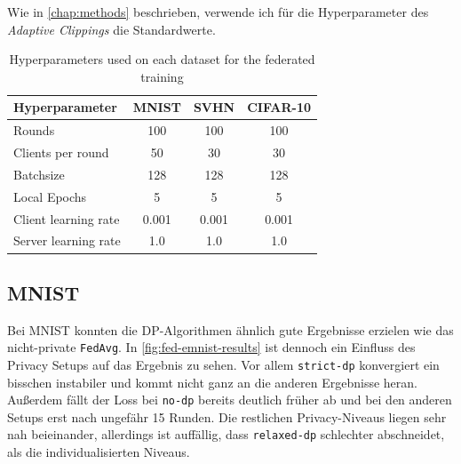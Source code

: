 Wie in \autoref{chap:methods} beschrieben, verwende ich für die Hyperparameter des \textit{Adaptive Clippings} die Standardwerte.

\begin{table}[tb]
	\centering
	\begin{tabular}{|l|c|c|c|}
		\hline
		Hyperparameter & MNIST & SVHN & CIFAR-10 \\
		\hline
		Rounds & 100 & 100 & 100 \\
		Clients per round & 50 & 30 & 30 \\
		Batchsize & 128 & 128 & 128 \\
		Local Epochs & 5 & 5 & 5 \\
		Client learning rate & 0.001 & 0.001 & 0.001 \\
		Server learning rate & 1.0 & 1.0 & 1.0 \\
		\hline
	\end{tabular}
	\caption{Hyperparameters used on each dataset for the federated training}
	\label{tab:fl-hyperparameters}
\end{table}

\subsection{MNIST}

Bei MNIST konnten die DP-Algorithmen ähnlich gute Ergebnisse erzielen wie das nicht-private \texttt{FedAvg}. In \autoref{fig:fed-emnist-results} ist dennoch ein Einfluss des Privacy Setups auf das Ergebnis zu sehen. Vor allem \texttt{strict-dp} konvergiert ein bisschen instabiler und kommt nicht ganz an die anderen Ergebnisse heran. Außerdem fällt der Loss bei \texttt{no-dp} bereits deutlich früher ab und bei den anderen Setups erst nach ungefähr 15 Runden. Die restlichen Privacy-Niveaus liegen sehr nah beieinander, allerdings ist auffällig, dass \texttt{relaxed-dp} schlechter abschneidet, als die individualisierten Niveaus.

